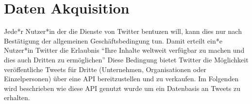 \chapter{Daten Akquisition}
\label{chap:akquisition}
Jede*r Nutzer*in der die Dienste von Twitter bentuzen will, kann dies nur nach Bestätigung der allgemeinen Geschäftsbedingung tun. Damit erteilt ein*e Nutzer*in Twitter die Erlaubnis "`Ihre Inhalte weltweit verfügbar zu machen und dies auch Dritten zu ermöglichen"'
Diese Bedingung bietet Twitter die Möglichkeit veröffentliche Tweets für Dritte (Unternehmen, Organisationen oder Einzelpersonen) über eine \ac{API} bereitzustellen und zu verkaufen. Im Folgenden wird beschrieben wie diese \ac{API} genutzt wurde um ein Datenbasis an Tweets zu erhalten.\\

